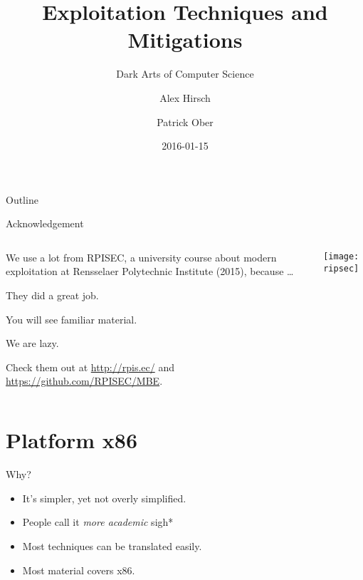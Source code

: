 \documentclass[beamer]{uibk}
\title{Exploitation Techniques and Mitigations}
\subtitle{Dark Arts of Computer Science}
\author{Alex Hirsch \and Patrick Ober}
\date{2016-01-15}
\begin{document}
\maketitle

\begin{frame}{Outline}
    \begin{multicols}{2}
        \tableofcontents
    \end{multicols}
\end{frame}

\begin{frame}{Acknowledgement}
    \begin{columns}
        \begin{column}{0.5\textwidth}
            We use a lot from RPISEC, a university course about modern
            exploitation at Rensselaer Polytechnic Institute (2015), because
            \dots

            \begin{description}
                \item<1->[of them:] They did a great job.
                \item<2->[of you:] You will see familiar material.
                \item<3->[of us:] We are lazy.
            \end{description}

            Check them out at \url{http://rpis.ec/} and
            \url{https://github.com/RPISEC/MBE}.
        \end{column}
        \begin{column}{0.5\textwidth}
            \texttt{[image: ripsec]}
        \end{column}
    \end{columns}
\end{frame}

\section{Platform x86}

\begin{frame}{Why?}
    \begin{itemize}
        \item It's simpler, yet not overly simplified.
        \item People call it \emph{more academic} \quad *sigh*
        \item Most techniques can be translated easily.
        \item Most material covers x86.
    \end{itemize}
\end{frame}
\end{document}
